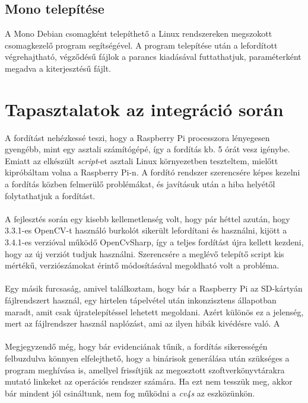 \subsection{Mono telepítése}

A Mono Debian csomagként telepíthető a Linux rendszereken megszokott  csomagkezelő program segítségével. A program telepítése után a lefordított végrehajtható,  végződésű fájlok a  parancs kiadásával futtathatjuk, paraméterként megadva a  kiterjesztésű fájlt.

\section{Tapasztalatok az integráció során}

A fordítást nehézkessé teszi, hogy a Raspberry Pi processzora lényegesen gyengébb, mint egy asztali számítógépé, így a fordítás kb. 5 órát vesz igénybe. Emiatt az elkészült \textit{script}-et asztali Linux környezetben teszteltem, mielőtt kipróbáltam volna a Raspberry Pi-n. A  fordító rendszer szerencsére képes kezelni a fordítás közben felmerülő problémákat, és javításuk után a hiba helyétől folytathatjuk a fordítást.\\
\\
A fejlesztés során egy kisebb kellemetlenség volt, hogy pár héttel azután, hogy 3.3.1-es OpenCV-t használó burkolót sikerült lefordítani és használni, kijött a 3.4.1-es verzióval működő OpenCvSharp, így a teljes fordítást újra kellett kezdeni, hogy az új verziót tudjuk használni. Szerencsére a meglévő telepítő script kis mértékű, verziószámokat érintő módosításával megoldható volt a probléma.\\
\\
Egy másik furcsaság, amivel találkoztam, hogy bár a Raspberry Pi az SD-kártyán  fájlrendszert használ, egy hirtelen tápelvétel után inkonzisztens állapotban maradt, amit csak újratelepítéssel lehetett megoldani. Azért különös ez a jelenség, mert az  fájlrendszer használ naplózást, ami az ilyen hibák kivédésre való. A \\
\\
Megjegyzendő még, hogy bár evidenciának tűnik, a fordítás sikerességén felbuzdulva könnyen elfelejthető, hogy a binárisok generálása után szükséges a  program meghívása is, amellyel frissítjük az megosztott szoftverkönyvtárakra mutató linkeket az operációs rendszer számára. Ha ezt nem tesszük meg, akkor bár mindent jól csináltunk, nem fog működni a \emph{cv4s} az eszközünkön.

